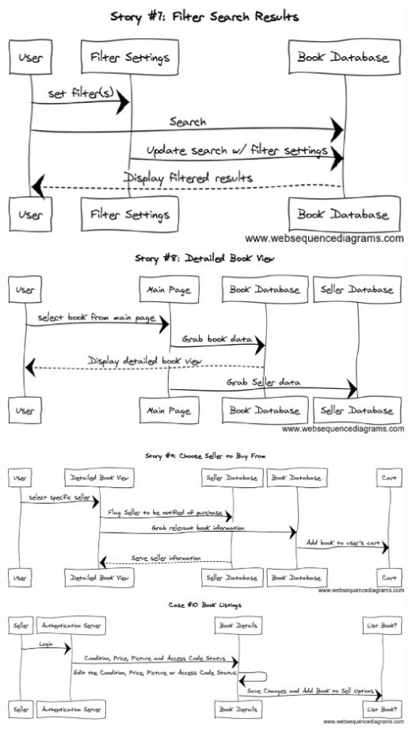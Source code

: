 \documentclass[12pt]{article}
\begin{document}
		\clearpage
 		\includegraphics[width=16cm]{story7.eps}
 		\clearpage
 		\includegraphics[width=16cm]{story8.eps}
 		\par
 		\vspace{5cm}
 		\includegraphics[width=17cm]{story9.eps}
 		\clearpage
 		\includegraphics[width=18cm]{story10.eps}
\end{document}

